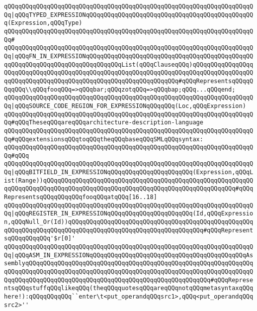 \verb|qQQqqQQqqQQqqQQqqQQqqQQqqQQqqQQqqQQqqQQqqQQqqQQqqQQqqQQqqQQqqQQqqQQqqQQq|\verb#|qQQqTYPED_EXPRESSIONqQQqqQQqqQQqqQQqqQQqqQQqqQQqqQQqqQQqqQQqqQQqqQQq(Expression,qQQqType)#\newline
\verb|qQQqqQQqqQQqqQQqqQQqqQQqqQQqqQQqqQQqqQQqqQQqqQQqqQQqqQQqqQQqqQQqqQQqqQQq#|\newline
\verb|qQQqqQQqqQQqqQQqqQQqqQQqqQQqqQQqqQQqqQQqqQQqqQQqqQQqqQQqqQQqqQQqqQQqqQQq|\verb#|qQQqFN_IN_EXPRESSIONqQQqqQQqqQQqqQQqqQQqqQQqqQQqqQQqqQQqqQQqqQQqqQQqqQQqqQQqqQQqqQQqqQQqqQQqqQQqqQQqList(qQQqClauseqQQq)qQQqqQQqqQQqqQQqqQQqqQQqqQQqqQQqqQQqqQQqqQQqqQQqqQQqqQQqqQQqqQQqqQQqqQQqqQQqqQQqqQQqqQQqqQQqqQQqqQQqqQQqqQQqqQQqqQQqqQQqqQQqqQQqqQQqqQQq#\verb|#qQQqRepresentsqQQqqQQqqQQq\\qQQqfooqQQq=>qQQqbar;qQQqzotqQQq=>qQQqbap;qQQq...qQQqend;|\newline
\verb|qQQqqQQqqQQqqQQqqQQqqQQqqQQqqQQqqQQqqQQqqQQqqQQqqQQqqQQqqQQqqQQqqQQqqQQq|\verb#|qQQqSOURCE_CODE_REGION_FOR_EXPRESSIONqQQqqQQq(Loc,qQQqExpression)#\newline
\newline
\verb|qQQqqQQqqQQqqQQqqQQqqQQqqQQqqQQqqQQqqQQqqQQqqQQqqQQqqQQqqQQqqQQqqQQqqQQq#qQQqTheseqQQqareqQQqarchitecture-description-language|\newline
\verb|qQQqqQQqqQQqqQQqqQQqqQQqqQQqqQQqqQQqqQQqqQQqqQQqqQQqqQQqqQQqqQQqqQQqqQQq#qQQqextensionsqQQqtoqQQqtheqQQqbaseqQQqSMLqQQqsyntax:|\newline
\verb|qQQqqQQqqQQqqQQqqQQqqQQqqQQqqQQqqQQqqQQqqQQqqQQqqQQqqQQqqQQqqQQqqQQqqQQq#qQQq|\newline
\verb|qQQqqQQqqQQqqQQqqQQqqQQqqQQqqQQqqQQqqQQqqQQqqQQqqQQqqQQqqQQqqQQqqQQqqQQq|\verb#|qQQqBITFIELD_IN_EXPRESSIONqQQqqQQqqQQqqQQqqQQqqQQq(Expression,qQQqList(Range))qQQqqQQqqQQqqQQqqQQqqQQqqQQqqQQqqQQqqQQqqQQqqQQqqQQqqQQqqQQqqQQqqQQqqQQqqQQqqQQqqQQqqQQqqQQqqQQqqQQqqQQqqQQqqQQqqQQqqQQqqQQq#\verb|#qQQqRepresentsqQQqqQQqqQQqfooqQQqatqQQq[16..18]|\newline
\verb|qQQqqQQqqQQqqQQqqQQqqQQqqQQqqQQqqQQqqQQqqQQqqQQqqQQqqQQqqQQqqQQqqQQqqQQq|\verb#|qQQqREGISTER_IN_EXPRESSIONqQQqqQQqqQQqqQQqqQQqqQQq(Id,qQQqExpression,qQQqNull_Or(Id))qQQqqQQqqQQqqQQqqQQqqQQqqQQqqQQqqQQqqQQqqQQqqQQqqQQqqQQqqQQqqQQqqQQqqQQqqQQqqQQqqQQqqQQqqQQqqQQqqQQqqQQqqQQq#\verb|#qQQqRepresentsqQQqqQQqqQQq'$r[0]'|\newline
\verb|qQQqqQQqqQQqqQQqqQQqqQQqqQQqqQQqqQQqqQQqqQQqqQQqqQQqqQQqqQQqqQQqqQQqqQQq|\verb#|qQQqASM_IN_EXPRESSIONqQQqqQQqqQQqqQQqqQQqqQQqqQQqqQQqqQQqqQQqqQQqAssemblyqQQqqQQqqQQqqQQqqQQqqQQqqQQqqQQqqQQqqQQqqQQqqQQqqQQqqQQqqQQqqQQqqQQqqQQqqQQqqQQqqQQqqQQqqQQqqQQqqQQqqQQqqQQqqQQqqQQqqQQqqQQqqQQqqQQqqQQqqQQqqQQqqQQqqQQqqQQqqQQqqQQqqQQqqQQqqQQqqQQqqQQqqQQqqQQq#\verb|#qQQqRepresentsqQQqstuffqQQqlikeqQQq(theqQQqquotesqQQqareqQQqnotqQQqmetasyntaxqQQqhere!):qQQqqQQqqQQq``enter\t<put_operandqQQqsrc1>,qQQq<put_operandqQQqsrc2>''|\newline
